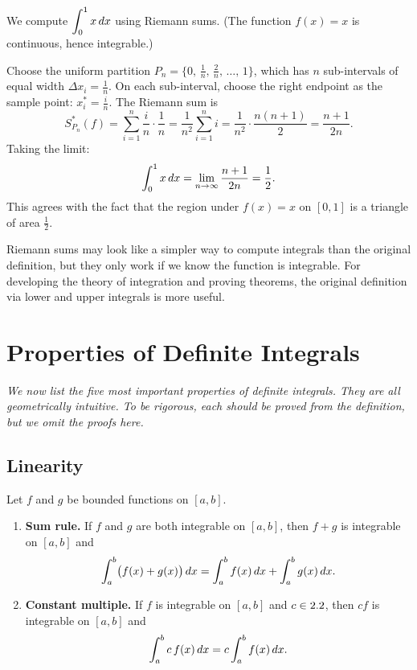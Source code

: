 \begin{example}[Integral of $f(x)=x$]
\label{ex:7-11}
We compute $\displaystyle\int_{0}^{1} x\,dx$ using Riemann sums.  (The function $f(x) = x$ is continuous, hence integrable.)

Choose the uniform partition $P_n = \bigl\{0,\,\frac{1}{n},\,\frac{2}{n},\,\ldots,\,1\bigr\}$, which has $n$ sub-intervals of equal width $\Delta x_i = \frac{1}{n}$.  On each sub-interval, choose the right endpoint as the sample point: $x_i^{*} = \frac{i}{n}$.  The Riemann sum is
\[
  S_{P_n}^{*}(f) = \sum_{i=1}^{n} \frac{i}{n}\cdot\frac{1}{n} = \frac{1}{n^{2}}\sum_{i=1}^{n} i = \frac{1}{n^{2}}\cdot\frac{n(n+1)}{2} = \frac{n+1}{2n}.
\]
Taking the limit:
\[
  \int_{0}^{1} x\,dx = \lim_{n\to\infty}\frac{n+1}{2n} = \frac{1}{2}.
\]
This agrees with the fact that the region under $f(x)=x$ on $[0,1]$ is a triangle of area $\frac{1}{2}$.
\end{example}

\begin{remark}
Riemann sums may look like a simpler way to compute integrals than the original definition, but they only work if we know the function is integrable.  For developing the theory of integration and proving theorems, the original definition via lower and upper integrals is more useful.
\end{remark}

\section{Properties of Definite Integrals}
\label{sec:7.11}

\textit{We now list the five most important properties of definite integrals.  They are all geometrically intuitive.  To be rigorous, each should be proved from the definition, but we omit the proofs here.}

\subsection*{Linearity}

\begin{theorem}
\label{thm:7-12}
Let $f$ and $g$ be bounded functions on $[a,b]$.
\begin{enumerate}[label=(\roman*)]
  \item \textbf{Sum rule.}  If $f$ and $g$ are both integrable on $[a,b]$, then $f+g$ is integrable on $[a,b]$ and
  \[
    \int_{a}^{b}\bigl(f(x)+g(x)\bigr)\,dx = \int_{a}^{b} f(x)\,dx + \int_{a}^{b} g(x)\,dx.
  \]
  \item \textbf{Constant multiple.}  If $f$ is integrable on $[a,b]$ and $c \in 2.2$, then $cf$ is integrable on $[a,b]$ and
  \[
    \int_{a}^{b} c\,f(x)\,dx = c\int_{a}^{b} f(x)\,dx.
  \]
\end{enumerate}
\end{theorem}

